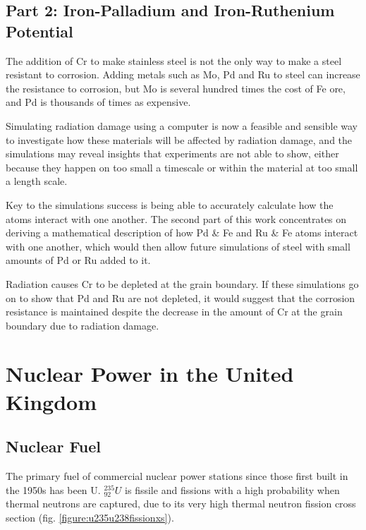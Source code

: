 \subsection{Part 2: Iron-Palladium and Iron-Ruthenium Potential}

The addition of \Gls{Cr} to make stainless steel is not the only way to make a steel resistant to corrosion.  Adding metals such as \Gls{Mo}, \Gls{Pd} and \Gls{Ru} to steel can increase the resistance to corrosion, but Mo is several hundred times the cost of Fe ore, and Pd is thousands of times as expensive.

Simulating radiation damage using a computer is now a feasible and sensible way to investigate how these materials will be affected by radiation damage, and the simulations may reveal insights that experiments are not able to show, either because they happen on too small a timescale or within the material at too small a length scale.

Key to the simulations success is being able to accurately calculate how the atoms interact with one another.  The second part of this work concentrates on deriving a mathematical description of how Pd \& Fe and Ru \& Fe atoms interact with one another, which would then allow future simulations of steel with small amounts of Pd or Ru added to it.

Radiation causes Cr to be depleted at the grain boundary.  If these simulations go on to show that Pd and Ru are not depleted, it would suggest that the corrosion resistance is maintained despite the decrease in the amount of Cr at the grain boundary due to radiation damage.




\FloatBarrier
\section{Nuclear Power in the United Kingdom}

\subsection{Nuclear Fuel}

The primary fuel of commercial nuclear power stations since those first built in the 1950s has been \Gls{U}.  ${}^{235}_{92}U$ is \gls{fissile} and fissions with a high probability when thermal neutrons are captured, due to its very high thermal neutron fission cross section (fig. \ref{figure:u235u238fissionxs}).

